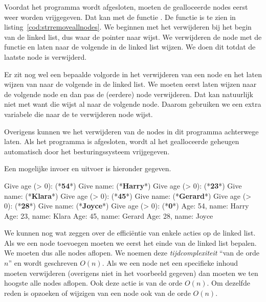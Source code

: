 
Voordat het programma wordt afgesloten, moeten de gealloceerde nodes eerst weer worden vrijgegeven. Dat kan met de functie . De functie is te zien in listing~\ref{cod:strremoveallnodes}. We beginnen met het verwijderen bij het begin van de linked list, dus waar de pointer  naar wijst. We verwijderen de node met de functie  en laten  naar de volgende in de linked list wijzen. We doen dit totdat de laatste node is verwijderd.

Er zit nog wel een bepaalde volgorde in het verwijderen van een node en het laten wijzen van  naar de volgende in de linked list. We moeten  eerst laten wijzen naar de volgende node en dan pas de (eerdere) node verwijderen. Dat kan natuurlijk niet met  want die wijst al naar de volgende node. Daarom gebruiken we een extra variabele  die naar de te verwijderen node wijst.


Overigens kunnen we het verwijderen van de nodes in dit programma achterwege laten. Als het programma is afgesloten, wordt al het gealloceerde geheugen automatisch door het besturingssysteem vrijgegeven.

Een mogelijke invoer en uitvoer is hieronder gegeven.

\begin{dosbox}[title=Mogelijke invoer en uitvoer van het programma.]
Give age (> 0): (*\textbf{54}*)
Give name: (*\textbf{Harry}*)
Give age (> 0): (*\textbf{23}*)
Give name: (*\textbf{Klara}*)
Give age (> 0): (*\textbf{45}*)
Give name: (*\textbf{Gerard}*)
Give age (> 0): (*\textbf{28}*)
Give name: (*\textbf{Joyce}*)
Give age (> 0): (*\textbf{0}*)
Age: 54, name: Harry
Age: 23, name: Klara
Age: 45, name: Gerard
Age: 28, name: Joyce
\end{dosbox}

We kunnen nog wat zeggen over de efficiëntie van enkele acties op de linked list. Als we een node toevoegen moeten we eerst het einde van de linked list bepalen. We moeten dus alle nodes aflopen. We noemen deze \textsl{tijdcomplexiteit} ``van de orde $n$'' en wordt geschreven $O(n)$. Als we een node net een specifieke inhoud moeten verwijderen (overigens niet in het voorbeeld gegeven) dan moeten we ten hoogste alle nodes aflopen. Ook deze actie is van de orde $O(n)$. Om dezelfde reden is opzoeken of wijzigen van een node ook van de orde $O(n)$.

